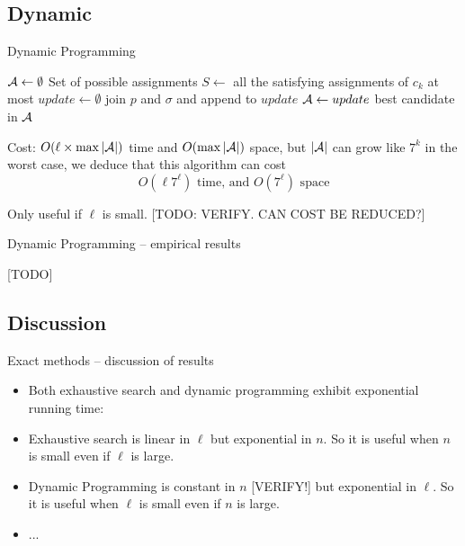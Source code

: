 \documentclass[aspectratio=169, compress, xcolor=table,xcolor=dvipsnames]{beamer}
\begin{document}
%
%
%
%

\subsection{Dynamic}

\begin{frame}
{Dynamic Programming}

\begin{algorithmic}[1]\sffamily
	\State $\cal A\gets\emptyset$
		\Comment Set of possible assignments
		\State $S\gets$ all the satisfying assignments of $c_k$
			 at most
		\State $update \gets \emptyset$
					\State join $p$ and $\sigma$ and append to $update$
				\EndIf
			\EndFor
		\EndFor
		\State ${\cal A}\gets update$
	\EndFor
	\State \Return best candidate in $\cal A$
\end{algorithmic}

\bigskip
\vfill

Cost: $O(\ell\times \max |\cal A|)$ time and $O(\max |\cal A|)$ space, but $|\cal A|$ can grow like $7^k$ in the worst case, we deduce that this algorithm can cost
\[O(\ell 7^\ell) \text{ time, and } O(7^\ell)\text{ space}\]

Only useful if $\ell$ is small.
[TODO: VERIFY. CAN COST BE REDUCED?]
\end{frame}

\begin{frame}
	{Dynamic Programming -- empirical results}

[TODO]

\end{frame}

\subsection{Discussion}

\begin{frame}
{Exact methods -- discussion of results}

\begin{itemize}
	\item Both exhaustive search and dynamic programming exhibit exponential running time:
	\item Exhaustive search is linear in $\ell$ but exponential in $n$.
	So it is useful when $n$ is small even if $\ell$ is large.
	\item Dynamic Programming is constant in $n$ [VERIFY!] but exponential in $\ell$.
	So it is useful when $\ell$ is small even if $n$ is large.
	\item ...
\end{itemize}
\end{frame}
\end{document}
